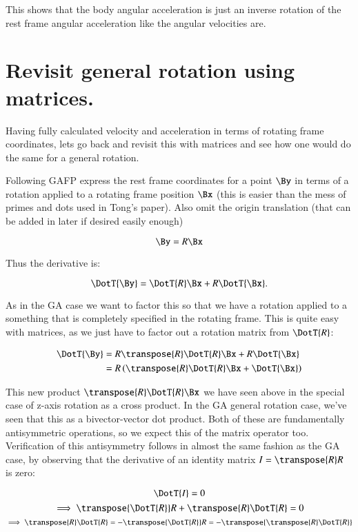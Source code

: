 This shows that the body angular acceleration is just an inverse rotation of the rest frame angular acceleration like the angular velocities are.

\section{Revisit general rotation using matrices. }

Having fully calculated velocity and acceleration in terms of rotating frame coordinates, lets
go back and revisit this with matrices and see how one would do the same for a general rotation.

Following GAFP express the rest frame coordinates for a point $\By$ in terms of a rotation
applied to a rotating frame position $\Bx$ (this is easier than the mess of primes and dots
used in Tong's paper).  Also omit the origin translation (that can be added in later if desired
easily enough)

\[
\By = R \Bx
\]

Thus the derivative is:

\[
\DotT{\By} = \DotT{R} \Bx + R \DotT{\Bx}.
\]

As in the GA case we want to factor this so that we have a rotation applied to a something
that is completely specified in the rotating frame.  This
is quite easy with matrices, as we just have to factor out a rotation matrix from $\DotT{R}$:

\begin{align*}
\DotT{\By} 
&= R \transpose{R}\DotT{R} \Bx + R \DotT{\Bx} \\
&= R \left(\transpose{R}\DotT{R} \Bx + \DotT{\Bx} \right) \\
\end{align*}

This new product $\transpose{R}\DotT{R} \Bx$ we have seen above in the special case of z-axis
rotation as a cross product.  In the GA general rotation case, we've seen that this as a
bivector-vector dot product.  Both of these are fundamentally antisymmetric operations,
so we expect this of the matrix operator too.  Verification of this antisymmetry follows
in almost the same fashion as the GA case, by observing that the derivative of an identity
matrix $I = \transpose{R}R$ is zero:

\[
\DotT{I} = 0
\]
\[
\implies
\transpose{\DotT{R}}R + \transpose{R}\DotT{R} = 0
\]
\[
\implies
\transpose{R}\DotT{R} = -\transpose{\DotT{R}}R = -\transpose{\transpose{R}\DotT{R}}
\]

